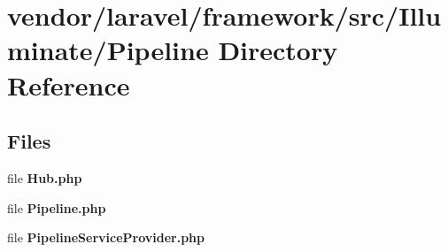 \section{vendor/laravel/framework/src/\+Illuminate/\+Pipeline Directory Reference}
\label{dir_29f5d2c877a7df721110368d7a5c3f6a}
\subsection*{Files}
\begin{DoxyCompactItemize}
\item 
file {\bf Hub.\+php}
\item 
file {\bf Pipeline.\+php}
\item 
file {\bf Pipeline\+Service\+Provider.\+php}
\end{DoxyCompactItemize}
